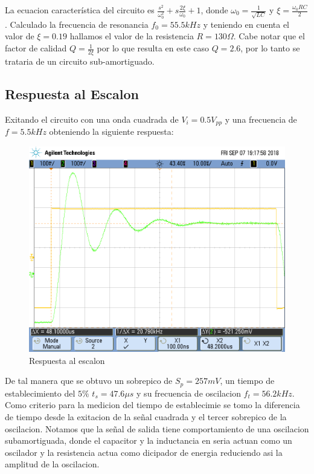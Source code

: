 La ecuacion característica del circuito es $\frac{s^2}{\omega_0^2}+s\frac{2\xi}{\omega_0}+1$, donde $\omega_0 = \frac{1}{\sqrt{LC}}$ y $\xi = \frac{\omega_0RC}{2}$. Calculado la frecuencia de resonancia $f_0=55.5kHz$ y teniendo en cuenta el valor de $\xi = 0.19$ hallamos el valor de la resistencia $R = 130\Omega$. Cabe notar que el factor de calidad $Q = \frac{1}{2\xi}$ por lo que resulta en este caso $Q = 2.6$, por lo tanto se trataria de un circuito sub-amortiguado. 

\subsection{Respuesta al Escalon}

Exitando el circuito con una onda cuadrada de $V_i = 0.5V_{pp}$ y una frecuencia de $f = 5.5kHz$ obteniendo la siguiente respuesta:

\begin{figure}[h!]
\centering
\includegraphics[scale=0.25]{LRC2a.png}
\caption{Respuesta al escalon}
\label{fig:LRC2a}
\end{figure}

De tal manera que se obtuvo un sobrepico de $S_p = 257mV$, un tiempo de establecimiento del $5\%$ $t_s = 47.6{\mu}s$ y su frecuencia de oscilacion $f_t = 56.2kHz$. Como criterio para la medicion del tiempo de establecimie se tomo la diferencia de tiempo desde la exitacion de la señal cuadrada y el tercer sobrepico de la oscilacion. Notamos que la señal de salida tiene comportamiento de una oscilacion subamortiguada, donde el capacitor y la inductancia en seria actuan como un oscilador y la resistencia actua como dicipador de energia reduciendo asi la amplitud de la oscilacion.

